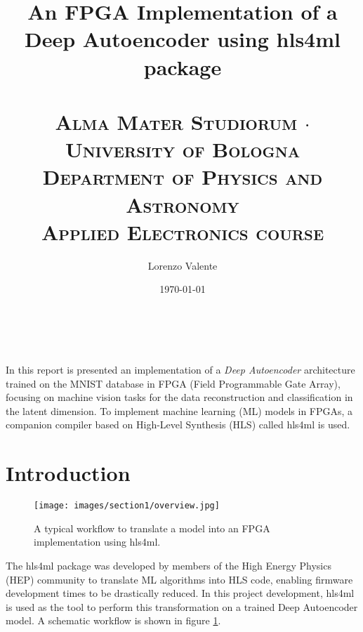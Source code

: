 \documentclass{article}
\title{
  \huge{\textbf{An FPGA Implementation of a\\ Deep Autoencoder using hls4ml package \\}}
  \Large{\textsc{\\ Alma Mater Studiorum $\cdot$ University of Bologna \\ }}
  \large{\textsc{Department of Physics and Astronomy \\}}
  \normalsize{\textsc{Applied Electronics course}}
  } %
\author{Lorenzo Valente} %
\date{\today} %
\begin{document}
\maketitle %

\begin{center}
\begin{tabular}{l r}
\end{tabular}
\end{center}



\section*{}
In this report is presented an implementation of a \textit{Deep Autoencoder} 
architecture trained on the MNIST database in FPGA (Field Programmable Gate Array), 
focusing on machine vision tasks for the data reconstruction and classification in the latent dimension.
To implement machine learning (ML) models in FPGAs, a companion compiler 
based on High-Level Synthesis (HLS) called hls4ml is used. 


\section{Introduction}


\begin{figure}[H]
  \centering
  \texttt{[image: images/section1/overview.jpg]}
  \caption{A typical workflow to translate a model into an FPGA implementation using hls4ml.}
  \label{fig:overview}
\end{figure}


The hls4ml package was developed by members of the High Energy Physics (HEP) community
to translate ML algorithms into HLS code, enabling firmware development times to be drastically reduced.
In this project development, hls4ml is used as the tool to perform 
this transformation on a trained Deep Autoencoder model.
A schematic workflow is shown in figure \ref{fig:overview}.
\end{document}

